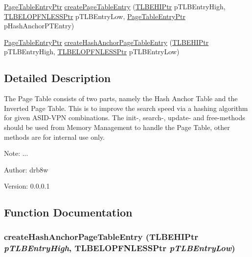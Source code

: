 \begin{CompactItemize}
\item 
\hyperlink{struct_page_table_entry}{PageTableEntryPtr} \hyperlink{group___v_m_m___p_t_g5002efe2fb3da2510b62affe18807174}{createPageTableEntry} (\hyperlink{struct_t_l_b_e_h_i}{TLBEHIPtr} pTLBEntryHigh, \hyperlink{struct_t_l_b_e_l_o_p_f_n_l_e_s_s}{TLBELOPFNLESSPtr} pTLBEntryLow, \hyperlink{struct_page_table_entry}{PageTableEntryPtr} pHashAnchorPTEntry)
\item 
\hyperlink{struct_page_table_entry}{PageTableEntryPtr} \hyperlink{group___v_m_m___p_t_g993bcff0f6138305b034e3b09e69cf8d}{createHashAnchorPageTableEntry} (\hyperlink{struct_t_l_b_e_h_i}{TLBEHIPtr} pTLBEntryHigh, \hyperlink{struct_t_l_b_e_l_o_p_f_n_l_e_s_s}{TLBELOPFNLESSPtr} pTLBEntryLow)
\end{CompactItemize}


\subsection{Detailed Description}
The Page Table consists of two parts, namely the Hash Anchor Table and the Inverted Page Table. This is to improve the search speed via a hashing algorithm for given ASID-VPN combinations. The init-, search-, update- and free-methods should be used from Memory Management to handle the Page Table, other methods are for internal use only. 

\begin{Desc}
\item[Note:]... \end{Desc}
\begin{Desc}
\item[Author:]drb8w \end{Desc}
\begin{Desc}
\item[Version:]0.0.0.1 \end{Desc}


\subsection{Function Documentation}
\hypertarget{group___v_m_m___p_t_g993bcff0f6138305b034e3b09e69cf8d}{
\subsubsection[{createHashAnchorPageTableEntry}]{ createHashAnchorPageTableEntry ({\bf TLBEHIPtr} {\em pTLBEntryHigh}, \/  {\bf TLBELOPFNLESSPtr} {\em pTLBEntryLow})}}
\label{group___v_m_m___p_t_g993bcff0f6138305b034e3b09e69cf8d}


